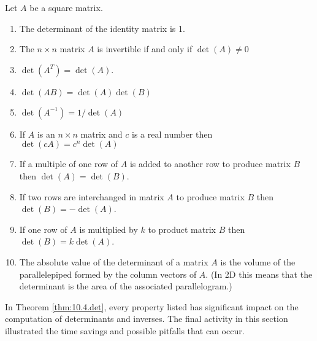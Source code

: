 \begin{thm}\label{thm:10.4.det}
    Let $A$ be a square matrix.
    \begin{enumerate}
        \item The determinant of the identity matrix is 1.
        \item The $n \times n$ matrix $A$ is invertible if and only if $\det(A) \ne 0$
        \item $\det(A^T) = \det(A)$.
        \item $\det(AB) = \det(A) \det(B)$
        \item $\det(A^{-1}) = 1/\det(A)$
        \item If $A$ is an $n \times n$ matrix and $c$ is a real number then
            $\det(c A) = c^n \det(A)$ 
        \item If a multiple of one row of $A$ is added to another row to produce matrix
            $B$ then $\det(A) = \det(B)$.
        \item If two rows are interchanged in matrix $A$ to produce matrix $B$ then
            $\det(B) = -\det(A)$.
        \item If one row of $A$ is multiplied by $k$ to product matrix $B$ then $\det(B) =
            k \det(A)$.
        \item The absolute value of the determinant of a matrix $A$ is the volume of the parallelepiped
            formed by the column vectors of $A$. (In 2D this means that the determinant is
            the area of the associated parallelogram.)
    \end{enumerate}
\end{thm}

In Theorem \ref{thm:10.4.det}, every property listed has significant impact on the
computation of determinants and inverses. The final activity in this section illustrated
the time savings and possible pitfalls that can occur.

